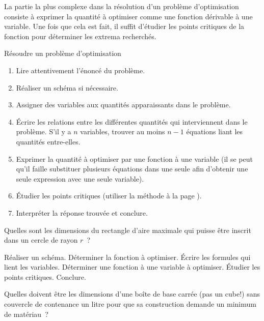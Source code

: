 \documentclass[a4paper,12pt]{article}
\begin{document}
La partie la plus complexe dans la résolution d'un problème d'optimisation consiste à exprimer la quantité à optimiser comme une fonction dérivable à une variable. Une fois que cela est fait, il suffit d'étudier les points critiques de la fonction pour déterminer les extrema recherchés. 
\begin{methode}
	Résoudre un problème d'optimisation
	\tcblower
	\begin{enumerate}
		\item Lire attentivement l'énoncé du problème.
		\item Réaliser un schéma si nécessaire.
		\item Assigner des variables aux quantités apparaissants dans le problème.
		\item Écrire les relations entre les différentes quantités qui interviennent dans le problème. S'il y a $n$ variables, trouver au moins $n-1$ équations liant les quantités entre-elles.
		\item Exprimer la quantité à optimiser par une fonction à une variable (il se peut qu'il faille substituer plusieurs équations dans une seule afin d'obtenir une seule expression avec une seule variable).
		\item Étudier les points critiques (utiliser la méthode à la page \pageref{met:ptcrit}).
		\item Interpréter la réponse trouvée et conclure.
	\end{enumerate}
\end{methode}

\begin{activite}
	Quelles sont les dimensions du rectangle d'aire maximale qui puisse être inscrit dans un cercle de rayon $r$~?
	\begin{tasks}
		\task Réaliser un schéma.
		\task Déterminer la fonction à optimiser.
		\task Écrire les formules qui lient les variables.
		\task Déterminer une fonction à une variable à optimiser.
		\task Étudier les points critiques.
		\task Conclure. 
	\end{tasks}
\end{activite}
\begin{activite}
	Quelles doivent être les dimensions d'une boîte de base carrée (pas un cube!) sans couvercle de contenance un litre pour que sa construction demande un minimum de matériau~?
\end{activite}

 \nocite{*}
 \vspace{-10pt}
 \printbibliography[prenote=myprenote,title={Sources du cours}] 
\end{document}
